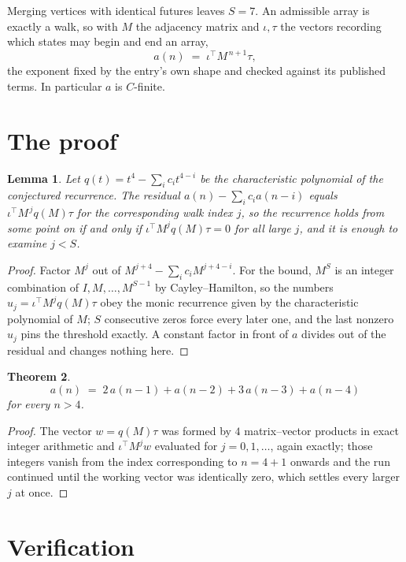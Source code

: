 \documentclass[11pt,a4paper]{article}
\theoremstyle{plain}
\newtheorem{theorem}{Theorem}
\newtheorem{lemma}[theorem]{Lemma}
\theoremstyle{definition}
\begin{document}
Merging vertices with identical futures leaves $S=7$. An admissible array is exactly a walk, so with $M$ the adjacency matrix and $\iota,\tau$ the vectors recording which states may begin and end an array,
\[
a(n)\;=\;\iota^{\!\top}M^{\,n+1}\tau ,
\]
the exponent fixed by the entry's own shape and checked against its published terms. In
particular $a$ is $C$-finite.

\section{The proof}

\begin{lemma}\label{lem:crit}
Let $q(t)=t^{4}-\sum_i c_it^{4-i}$ be the characteristic polynomial of the
conjectured recurrence. The residual $a(n)-\sum_ic_ia(n-i)$ equals
$\iota^{\!\top}M^{\,j}q(M)\tau$ for the corresponding walk index $j$, so the recurrence
holds from some point on if and only if $\iota^{\!\top}M^{j}q(M)\tau=0$ for all large $j$,
and it is enough to examine $j<S$.
\end{lemma}

\begin{proof}
Factor $M^{j}$ out of $M^{j+4}-\sum_ic_iM^{j+4-i}$. For the bound, $M^{S}$
is an integer combination of $I,M,\dots,M^{S-1}$ by Cayley--Hamilton, so the numbers
$u_j=\iota^{\!\top}M^{j}q(M)\tau$ obey the monic recurrence given by the characteristic
polynomial of $M$; $S$ consecutive zeros force every later one, and the last nonzero $u_j$
pins the threshold exactly. A constant factor in front of $a$ divides out of the residual and
changes nothing here.
\end{proof}

\begin{theorem}
\[
a(n)\;=\;2\,a(n-1) + a(n-2) + 3\,a(n-3) + a(n-4)
\]
for every $n>4$.
\end{theorem}

\begin{proof}
The vector $w=q(M)\tau$ was formed by $4$ matrix--vector products in exact integer
arithmetic and $\iota^{\!\top}M^{j}w$ evaluated for $j=0,1,\dots$, again exactly; those
integers vanish from the index corresponding to $n=4+1$ onwards and the run continued
until the working vector was identically zero, which settles every larger $j$ at once.
\end{proof}

\section{Verification}
\end{document}
